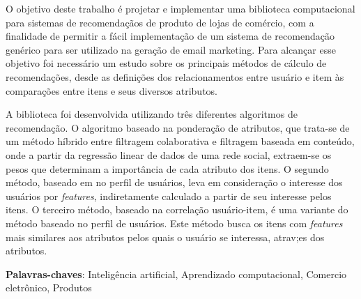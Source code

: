 \setlength{\absparsep}{18pt} %
\begin{resumo}
O objetivo deste trabalho é projetar e implementar uma biblioteca computacional para sistemas de recomendaçãos de produto de lojas de comércio, com a finalidade de permitir a fácil implementação de um sistema de recomendação genérico para ser utilizado na geração de email marketing. Para alcançar esse objetivo foi necessário um estudo sobre os principais métodos de cálculo de recomendações, desde as definições dos relacionamentos entre usuário e item às comparações entre itens e seus diversos atributos.

A biblioteca foi desenvolvida utilizando três diferentes algoritmos de recomendação. O algoritmo baseado na ponderação de atributos, que trata-se de um método híbrido entre filtragem colaborativa e filtragem baseada em conteúdo, onde a partir da
regressão linear de dados de uma rede social, extraem-se os pesos que determinam a importância de cada atributo dos itens. O segundo método, baseado em no perfil de usuários, leva em consideração o interesse dos usuários por \textit{features}, indiretamente calculado a partir de seu interesse pelos itens. O terceiro método, baseado na correlação usuário-item, é uma variante do método baseado no perfil de usuários. Este método busca os itens com \textit{features} mais similares aos atributos pelos quais o usuário se interessa, atrav;es dos atributos.


 \textbf{Palavras-chaves}: Inteligência artificial, Aprendizado computacional, Comercio eletrônico, Produtos
\end{resumo}